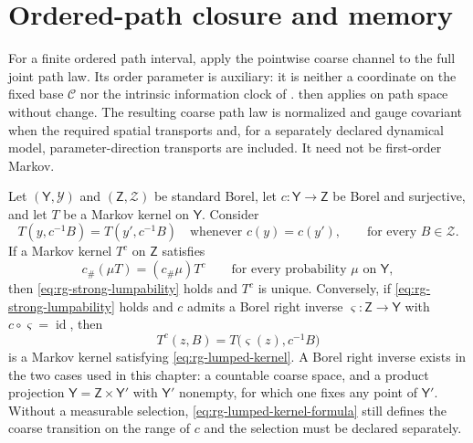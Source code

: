 \section{Ordered-path closure and memory}
\label{sec:rg-path-space}

For a finite ordered path interval, apply the pointwise coarse channel to the
full joint path law.  Its order parameter is auxiliary: it is neither a
coordinate on the fixed base $\mathcal C$ nor the intrinsic information clock
of .   then applies
on path space without change.  The resulting coarse path law is normalized
and gauge covariant when the required spatial transports and, for a separately
declared dynamical model, parameter-direction transports are included.  It
need not be first-order Markov.  

Let $(\mathsf Y,\mathscr Y)$ and $(\mathsf Z,\mathscr Z)$ be standard Borel, let
$c:\mathsf Y\to\mathsf Z$ be Borel and surjective, and let $T$ be a Markov
kernel on $\mathsf Y$.  Consider
\begin{equation}
T(y,c^{-1}B)=T(y',c^{-1}B)
\quad\text{whenever }c(y)=c(y'),
\qquad\text{for every }B\in\mathscr Z.
\label{eq:rg-strong-lumpability}
\end{equation}
If a Markov kernel $T^c$ on $\mathsf Z$ satisfies
\begin{equation}
c_\#(\mu T)=(c_\#\mu)T^c
\qquad\text{for every probability }\mu\text{ on }\mathsf Y,
\label{eq:rg-lumped-kernel}
\end{equation}
then \eqref{eq:rg-strong-lumpability} holds and $T^c$ is unique.  Conversely, if
\eqref{eq:rg-strong-lumpability} holds and $c$ admits a Borel right inverse
$\varsigma:\mathsf Z\to\mathsf Y$ with $c\circ\varsigma=\operatorname{id}$, then
\begin{equation}
T^c(z,B)=T\bigl(\varsigma(z),c^{-1}B\bigr)
\label{eq:rg-lumped-kernel-formula}
\end{equation}
is a Markov kernel satisfying \eqref{eq:rg-lumped-kernel}.  A Borel right
inverse exists in the two cases used in this chapter: a countable coarse space,
and a product projection $\mathsf Y=\mathsf Z\times\mathsf Y'$ with $\mathsf Y'$
nonempty, for which one fixes any point of $\mathsf Y'$.  Without a measurable
selection, \eqref{eq:rg-lumped-kernel-formula} still defines the coarse
transition on the range of $c$ and the selection must be declared separately.

